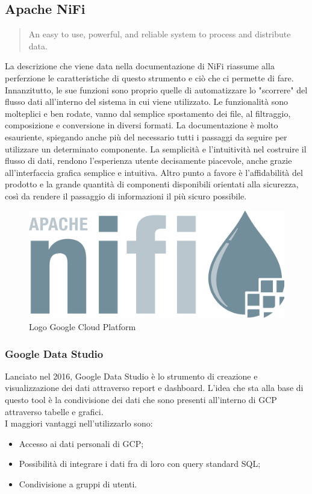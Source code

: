 \subsection{Apache NiFi}
\begin{quotation}
An easy to use, powerful, and reliable system to process and distribute data.
\end{quotation}
La descrizione che viene data nella documentazione di NiFi \cite{NiFi} riassume alla perferzione le caratteristiche di questo strumento e ciò che ci permette di fare.
\\
Innanzitutto, le sue funzioni sono proprio quelle di automatizzare lo "scorrere" del flusso dati all'interno del sistema in cui viene utilizzato. Le funzionalità sono molteplici e ben rodate, vanno dal semplice spostamento dei file, al filtraggio, composizione e conversione in diversi formati. La documentazione è molto esauriente, spiegando anche più del necessario tutti i passaggi da seguire per utilizzare un determinato componente. La semplicità e l'intuitività nel costruire il flusso di dati, rendono l'esperienza utente decisamente piacevole, anche grazie all'interfaccia grafica semplice e intuitiva. Altro punto a favore è l'affidabilità del prodotto e la grande quantità di componenti disponibili orientati alla sicurezza, così da rendere il passaggio di informazioni il più sicuro possibile.
\begin{figure}[h!]
	\centering
	\includegraphics[scale=0.1]{figures/apache-nifi-logo}
	\caption[Logo Google Cloud Platform.]{Logo Google Cloud Platform
		\label{fig:logoGCP}}
\end{figure}
\subsubsection{Google Data Studio}
Lanciato nel 2016, Google Data Studio è lo strumento di creazione e visualizzazione dei dati attraverso report e dashboard. L'idea che sta alla base di questo tool è la condivisione dei dati che sono presenti all'interno di GCP attraverso tabelle e grafici.
\\ I maggiori vantaggi nell'utilizzarlo sono:
\begin{itemize}
	\item Accesso ai dati personali di GCP;
	\item Possibilità di integrare i dati fra di loro con query standard SQL;
	\item Condivisione a gruppi di utenti. 
\end{itemize}

